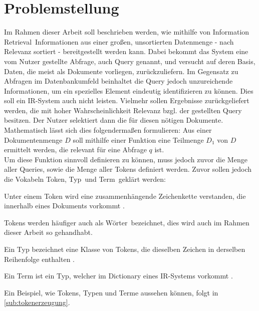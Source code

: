 \section{Problemstellung}
Im Rahmen dieser Arbeit soll beschrieben werden, wie mithilfe von \glqq Information Retrieval\grqq\ Informationen aus einer großen, unsortierten Datenmenge - nach Relevanz sortiert - bereitgestellt werden kann. Dabei bekommt das System eine vom Nutzer gestellte Abfrage, auch Query genannt, und versucht auf deren Basis, Daten, die meist als Dokumente vorliegen, zurückzuliefern. Im Gegensatz zu Abfragen im Datenbankumfeld beinhaltet die Query jedoch unzureichende Informationen, um ein spezielles Element eindeutig identifizieren zu können. Dies soll ein IR-System auch nicht leisten. Vielmehr sollen Ergebnisse zurückgeliefert werden, die mit hoher Wahrscheinlichkeit Relevanz bzgl. der gestellten Query besitzen. Der Nutzer selektiert dann die für diesen nötigen Dokumente.
\\
Mathematisch lässt sich dies folgendermaßen formulieren: Aus einer Dokumentenmenge $D$ soll mithilfe einer Funktion eine Teilmenge $D_1$ von $D$ ermittelt werden, die relevant für eine Abfrage $q$ ist.
\\
Um diese Funktion sinnvoll definieren zu können, muss jedoch zuvor die Menge aller Queries, sowie die Menge aller Tokens definiert werden. Zuvor sollen jedoch die Vokabeln \glqq Token\grqq, \glqq Typ\grqq\ und \glqq Term\grqq\ geklärt werden:

\begin{defi}[Token]\label{def:Token}
	Unter einem Token wird eine zusammenhängende Zeichenkette verstanden, die innerhalb eines Dokuments vorkommt \cite{IR_Intro_Cambridge}.
\end{defi}

Tokens werden häufiger auch als \glqq Wörter\grqq\ bezeichnet, dies wird auch im Rahmen dieser Arbeit so gehandhabt.

\begin{defi}[Typ]\label{def:Typ}
	Ein Typ bezeichnet eine Klasse von Tokens, die dieselben Zeichen in derselben Reihenfolge enthalten \cite{IR_Intro_Cambridge}.
\end{defi}
\begin{defi}[Term]\label{def:Term}
	Ein Term ist ein Typ, welcher im Dictionary eines IR-Systems vorkommt \cite{IR_Intro_Cambridge}.
\end{defi}

Ein Beispiel, wie Tokens, Typen und Terme aussehen können, folgt in \ref{sub:tokenerzeugung}.


